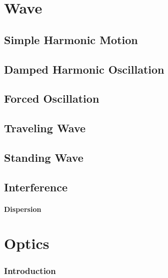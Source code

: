\documentclass[10pt]{report}
\begin{document}
\chapter*{Wave}

\section*{Simple Harmonic Motion}
\clearpage

\section*{Damped Harmonic Oscillation}
\clearpage

\section*{Forced Oscillation}
\clearpage

\section*{Traveling Wave}
\clearpage
\clearpage

\section*{Standing Wave}
\clearpage

\section*{Interference}
\clearpage
\clearpage

\subsubsection*{Dispersion}
\clearpage

\chapter*{Optics}
\subsection*{Introduction}
\clearpage
\printbibliography
\end{document}
